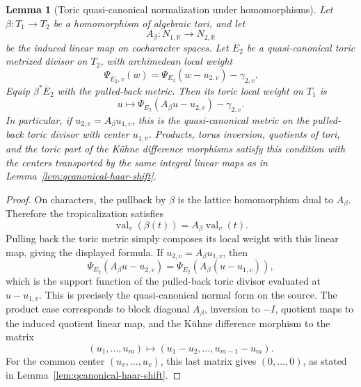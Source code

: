 \documentclass[10pt,a4paper]{amsart}
\theoremstyle{plain}
\newtheorem{lemma}[theorem]{Lemma}
\theoremstyle{plain}
\numberwithin{equation}{section}
\providecommand{\bE}{\overline{E}}
\begin{document}
\begin{lemma}[Toric quasi-canonical normalization under homomorphisms]
	\label{lem:toric-qcanonical-operation-normalization}
	Let \(\beta:T_1\to T_2\) be a homomorphism of algebraic tori, and let
	\[
	A_\beta:N_{1,\mathbb R}\longrightarrow N_{2,\mathbb R}
	\]
	be the induced linear map on cocharacter spaces.  Let \(\bE_2\) be a
	quasi-canonical toric metrized divisor on \(T_2\), with archimedean local
	weight
	\[
	\Psi_{\bE_2,v}(w)=\Psi_{E_2}(w-u_{2,v})-\gamma_{2,v}.
	\]
	Equip \(\beta^*\bE_2\) with the pulled-back metric.  Then its toric local
	weight on \(T_1\) is
	\[
	u\longmapsto
	\Psi_{E_2}(A_\beta u-u_{2,v})-\gamma_{2,v}.
	\]
	In particular, if \(u_{2,v}=A_\beta u_{1,v}\), this is the
	quasi-canonical metric on the pulled-back toric divisor with center
	\(u_{1,v}\).  Products, torus inversion, quotients of tori, and the toric
	part of the K\"uhne difference morphisms satisfy this condition with the
	centers transported by the same integral linear maps as in
	Lemma~\ref{lem:qcanonical-haar-shift}.
\end{lemma}

\begin{proof}
	On characters, the pullback by \(\beta\) is the lattice homomorphism dual to
	\(A_\beta\).  Therefore the tropicalization satisfies
	\[
	\operatorname{val}_v(\beta(t))=A_\beta\operatorname{val}_v(t).
	\]
	Pulling back the toric metric simply composes its local weight with this
	linear map, giving the displayed formula.  If \(u_{2,v}=A_\beta u_{1,v}\),
	then
	\[
	\Psi_{E_2}(A_\beta u-u_{2,v})
	=
	\Psi_{E_2}(A_\beta(u-u_{1,v})),
	\]
	which is the support function of the pulled-back toric divisor evaluated at
	\(u-u_{1,v}\).  This is precisely the quasi-canonical normal form on the
	source.  The product case corresponds to block diagonal \(A_\beta\), inversion
	to \(-I\), quotient maps to the induced quotient linear map, and the K\"uhne
	difference morphism to the matrix
	\[
	(u_1,\ldots,u_m)\longmapsto
	(u_1-u_2,\ldots,u_{m-1}-u_m).
	\]
	For the common center \((u_v,\ldots,u_v)\), this last matrix gives
	\((0,\ldots,0)\), as stated in Lemma~\ref{lem:qcanonical-haar-shift}.
\end{proof}
\end{document}
